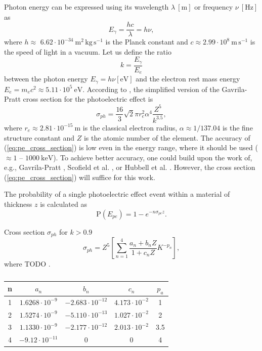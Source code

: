 \documentclass[a4paper,11pt,titlepage,twoside]{book}
\newcommand{\unit}[2]{$#1~\ensuremath{\mathrm{#2}}$}
\begin{document}
Photon energy can be expressed using its wavelength \unit{\lambda}{\left[m\right]} or frequency \unit{\nu}{\left[Hz\right]} as
\begin{equation}
  E_{\gamma} = \frac{hc}{\lambda} = h\nu,
\end{equation}
where $h \approx $ \unit{6.62 \cdot 10^{-34}}{m^2\,kg\,s^{-1}} is the Planck constant and \unit{c \approx 2.99 \cdot 10^{8}}{m\,s^{-1}} is the speed of light in a vacuum.
Let us define the ratio
\begin{equation}
  k = \frac{E_{\gamma}}{E_e}
\end{equation}
between the photon energy $E_{\gamma} = h\nu \left[\mathrm{eV}\right]$ and the electron rest mass energy \unit{E_e = m_ec^2 \approx 5.11 \cdot 10^5}{eV}.
According to \cite{fornalski2018simple}, the simplified version of the Gavrila-Pratt \cite{davisson1965interaction} cross section for the photoelectric effect is
\begin{equation}
  \label{eq:pe_cross_section}
  \sigma_{ph} = \frac{16}{3}\sqrt{2}\pi r_e^2\alpha^4\frac{Z^5}{k^{3.5}},
\end{equation}
where \unit{r_e \approx 2.81 \cdot 10^{-15}}{m} is the classical electron radius, $\alpha \approx 1/137.04$ is the fine structure constant and $Z$ is the atomic number of the element.
The accuracy of (\ref{eq:pe_cross_section}) is low even in the energy range, where it should be used ($\approx 1$ -- \unit{1000}{keV}).
To achieve better accuracy, one could build upon the work of, e.g., Gavrila-Pratt \cite{davisson1965interaction}, Scofield et al. \cite{scofield1973theoretical}, or Hubbell et al. \cite{hubbell1980pair}.
However, the cross section (\ref{eq:pe_cross_section}) will suffice for this work.

The probability of a single photoelectric effect event within a material of thickness $z$ is calculated as
\begin{equation}
  \mathrm{P}\left(E_{pe}\right) = 1 - e^{-n\sigma_{pe} z}.
\end{equation}

Cross section $\sigma_{ph}$ for $k > 0.9$
\begin{equation}
  \sigma_{ph} = Z^5\left[\sum_{n=1}^4 \frac{a_n + b_nZ}{1 + c_nZ}K^{-p_n}\right],
\end{equation}
where {\color{red} TODO } \cite{hubbell1980pair}.
\begin{table}
  \centering
  \begin{tabular}{c c c c c}
    \hline
    n & $a_n$ & $b_n$ & $c_n$ & $p_a$ \\
    \hline
    1 \rule{0pt}{2.3ex} & $1.6268 \cdot 10^{-9}$ & $-2.683 \cdot 10^{-12}$ & $4.173 \cdot 10^{-2}$ & 1 \\
    2 & $1.5274 \cdot 10^{-9}$ & $-5.110 \cdot 10^{-13}$ & $1.027 \cdot 10^{-2}$ & 2 \\
    3 & $1.1330 \cdot 10^{-9}$ & $-2.177 \cdot 10^{-12}$ & $2.013 \cdot 10^{-2}$ & 3.5 \\
    4 & $-9.12 \cdot 10^{-11}$ & 0 & 0 & 4\\
    \hline
  \end{tabular}
  \caption{\cite{hubbell1980pair}}
\end{table}
\end{document}

